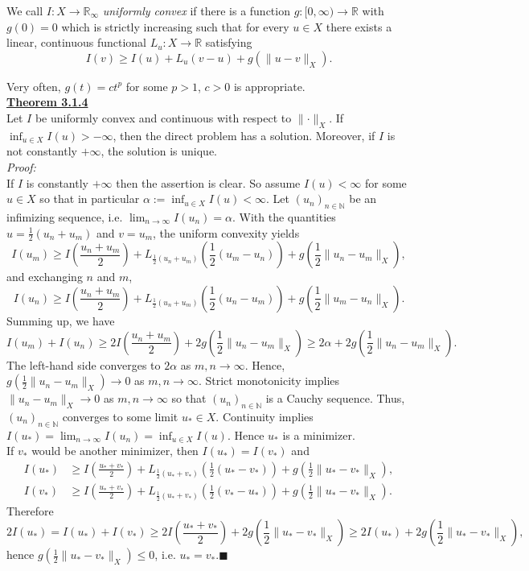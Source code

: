 We call $I:X\longrightarrow\mathbb{R}_\infty$ \textit{uniformly convex} if there is a function $g:[0,\infty)\longrightarrow\mathbb{R}$ with $g(0)=0$ which is strictly increasing such that for every $u\in X$ there exists a linear, continuous functional $L_u:X\longrightarrow\mathbb{R}$ satisfying
\[I(v)\geq I(u)+L_u(v-u)+g(\lVert u-v\rVert_X).\]

Very often, $g(t)=ct^p$ for some $p>1$, $c>0$ is appropriate.\\[11pt]

\textbf{\underline{Theorem 3.1.4}}\\
Let $I$ be uniformly convex and continuous with respect to $\lVert\cdot\rVert_X$. If $\inf_{u\in X}{I(u)}>-\infty$, then the direct problem has a solution. Moreover, if $I$ is not constantly $+\infty$, the solution is unique.\\

\textit{Proof:}\\
If $I$ is constantly $+\infty$ then the assertion is clear. So assume $I(u)<\infty$ for some $u\in X$ so that in particular $\alpha:=\inf_{u\in X}{I(u)}<\infty$. Let $(u_n)_{n\in\mathbb{N}}$ be an infimizing sequence, i.e. $\lim_{n\to\infty}{I(u_n)}=\alpha$. With the quantities $u=\frac{1}{2}(u_n+u_m)$ and $v=u_m$, the uniform convexity yields
\[I(u_m)\geq I\left(\frac{u_n+u_m}{2}\right)+L_{\frac{1}{2}(u_n+u_m)}\left(\frac{1}{2}(u_m-u_n)\right)+g\left(\frac{1}{2}\lVert u_n-u_m\rVert_X\right),\]
and exchanging $n$ and $m$,
\[I(u_n)\geq I\left(\frac{u_n+u_m}{2}\right)+L_{\frac{1}{2}(u_n+u_m)}\left(\frac{1}{2}(u_n-u_m)\right)+g\left(\frac{1}{2}\lVert u_m-u_n\rVert_X\right).\]
Summing up, we have
\[I(u_m)+I(u_n)\geq 2I\left(\frac{u_n+u_m}{2}\right)+2g\left(\frac{1}{2}\lVert u_n-u_m\rVert_X\right)\geq 2\alpha+2g\left(\frac{1}{2}\lVert u_n-u_m\rVert_X\right).\]
The left-hand side converges to $2\alpha$ as $m,n\to\infty$. Hence, $g\left(\frac{1}{2}\lVert u_n-u_m\rVert_X\right)\to0$ as $m,n\to\infty$. Strict monotonicity implies $\lVert u_n-u_m\rVert_X\to0$ as $m,n\to\infty$ so that $(u_n)_{n\in\mathbb{N}}$ is a Cauchy sequence. Thus, $(u_n)_{n\in\mathbb{N}}$ converges to some limit $u_*\in X$. Continuity implies $I(u_*)=\lim_{n\to\infty}{I(u_n)}=\inf_{u\in X}{I(u)}$. Hence $u_*$ is a minimizer.\\

If $v_*$ would be another minimizer, then $I(u_*)=I(v_*)$ and
\begin{align*}
	I(u_*)&\geq I\left(\frac{u_*+v_*}{2}\right)+L_{\frac{1}{2}(u_*+v_*)}\left(\frac{1}{2}(u_*-v_*)\right)+g\left(\frac{1}{2}\lVert u_*-v_*\rVert_X\right),\\
	I(v_*)&\geq I\left(\frac{u_*+v_*}{2}\right)+L_{\frac{1}{2}(u_*+v_*)}\left(\frac{1}{2}(v_*-u_*)\right)+g\left(\frac{1}{2}\lVert u_*-v_*\rVert_X\right).
\end{align*}
Therefore
\[2I(u_*)=I(u_*)+I(v_*)\geq 2I\left(\frac{u_*+v_*}{2}\right)+2g\left(\frac{1}{2}\lVert u_*-v_*\rVert_X\right)\geq 2I(u_*)+2g\left(\frac{1}{2}\lVert u_*-v_*\rVert_X\right),\]
hence $g\left(\frac{1}{2}\lVert u_*-v_*\rVert_X\right)\leq0$, i.e. $u_*=v_*$.\hfill$\blacksquare$\\[11pt]

